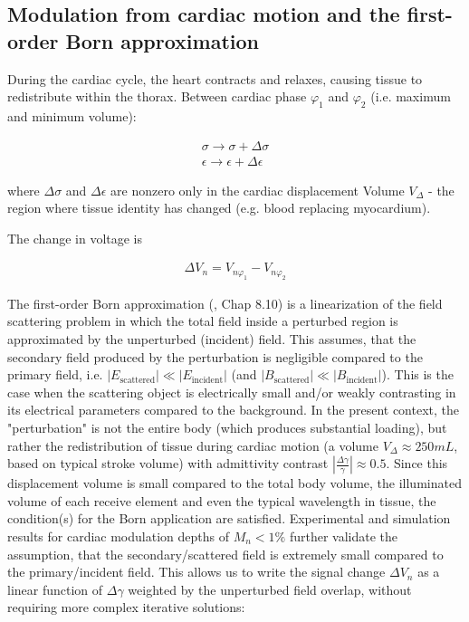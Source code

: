 \subsection{Modulation from cardiac motion and the first-order Born approximation}

During the cardiac cycle, the heart contracts and relaxes, causing tissue to redistribute within the thorax. Between cardiac phase $\varphi_1$ and $\varphi_2$ (i.e. maximum and minimum volume):

\begin{align}
    \label{tissueRedist}
    \sigma \rightarrow \sigma + \Delta \sigma \\
    \epsilon \rightarrow \epsilon + \Delta \epsilon
\end{align}

where $\Delta \sigma$ and $\Delta \epsilon$ are nonzero only in the cardiac displacement Volume $V_{\Delta}$ - the region where tissue identity has changed (e.g. blood replacing myocardium).

The change in voltage is

\begin{align}
    \label{replaceVoltage}
    \Delta V_n = V_{n\varphi_1} - V_{n\varphi_2}
\end{align}

The first-order Born approximation (\cite{Chew1995MathematicalTheory}, Chap 8.10) is a linearization of the field scattering problem in which the total field inside a perturbed region is approximated by the unperturbed (incident) field.
This assumes, that the secondary field produced by the perturbation is negligible compared to the primary field, i.e. $|E_{\mathrm{scattered}}| \ll |E_{\mathrm{incident}}|$ (and $|B_{\mathrm{scattered}}| \ll |B_{\mathrm{incident}}|$). This is the case when the scattering object is electrically small and/or weakly contrasting in its electrical parameters compared to the background.
In the present context, the "perturbation" is not the entire body (which produces substantial loading), but rather the redistribution of tissue during cardiac motion (a volume $V_{\Delta} \approx 250mL$, based on typical stroke volume) with admittivity contrast $|\frac{\Delta \gamma}{\gamma}| \approx 0.5$. Since this displacement volume is small compared to the total body volume, the illuminated volume of each receive element and even the typical wavelength in tissue, the condition(s) for the Born application are satisfied. Experimental and simulation results for cardiac modulation depths of $M_n<1\%$ further validate the assumption, that the secondary/scattered field is extremely small compared to the primary/incident field.
This allows us to write the signal change $\Delta V_n$ as a linear function of $\Delta\gamma$ weighted by the unperturbed field overlap, without requiring more complex iterative solutions:

